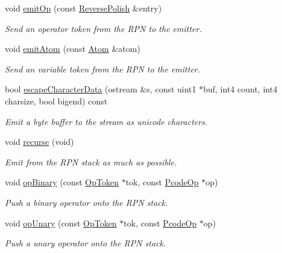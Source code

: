 \begin{DoxyCompactItemize}
void \mbox{\hyperlink{class_print_language_a61cfb2515689f57d3d3b5895b52ef078}{emit\+Op}} (const \mbox{\hyperlink{struct_print_language_1_1_reverse_polish}{Reverse\+Polish}} \&entry)
\begin{DoxyCompactList}\small\item\em Send an operator token from the R\+PN to the emitter. \end{DoxyCompactList}\item 
void \mbox{\hyperlink{class_print_language_ad5077f844d4095c52594fc946893db87}{emit\+Atom}} (const \mbox{\hyperlink{struct_print_language_1_1_atom}{Atom}} \&atom)
\begin{DoxyCompactList}\small\item\em Send an variable token from the R\+PN to the emitter. \end{DoxyCompactList}\item 
bool \mbox{\hyperlink{class_print_language_a846d6e68f8bbdde7cf6a442d2ce5fc16}{escape\+Character\+Data}} (ostream \&s, const uint1 $\ast$buf, int4 count, int4 charsize, bool bigend) const
\begin{DoxyCompactList}\small\item\em Emit a byte buffer to the stream as unicode characters. \end{DoxyCompactList}\item 
void \mbox{\hyperlink{class_print_language_a193f787ccd9f5466a7b97feb084687d6}{recurse}} (void)
\begin{DoxyCompactList}\small\item\em Emit from the R\+PN stack as much as possible. \end{DoxyCompactList}\item 
void \mbox{\hyperlink{class_print_language_a685bceb682b22e22470d649e0d4c3308}{op\+Binary}} (const \mbox{\hyperlink{class_op_token}{Op\+Token}} $\ast$tok, const \mbox{\hyperlink{class_pcode_op}{Pcode\+Op}} $\ast$op)
\begin{DoxyCompactList}\small\item\em Push a binary operator onto the R\+PN stack. \end{DoxyCompactList}\item 
void \mbox{\hyperlink{class_print_language_aff68af4415bc2cc51d86240c9427bd87}{op\+Unary}} (const \mbox{\hyperlink{class_op_token}{Op\+Token}} $\ast$tok, const \mbox{\hyperlink{class_pcode_op}{Pcode\+Op}} $\ast$op)
\begin{DoxyCompactList}\small\item\em Push a unary operator onto the R\+PN stack. \end{DoxyCompactList}\item 

\end{DoxyCompactItemize}
